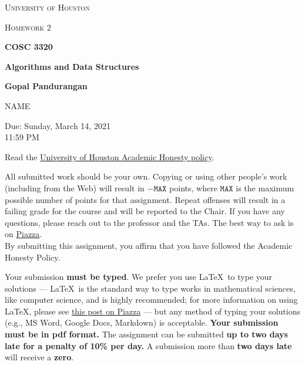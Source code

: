 \documentclass[draft]{article}
\begin{document}
\begin{titlepage}
    \begin{center}
        {\scshape\LARGE University of Houston\par}
        \vspace{1cm}
        {\scshape\Large Homework 2 \par}
        \vspace{1.5cm}
        {\huge\bfseries COSC 3320 \par}
        {\huge\bfseries Algorithms and Data Structures \par}
        \vspace{0.5cm}
        {\large\bfseries Gopal Pandurangan\par}
        \vspace{2cm}
        {\Large NAME\par}
        \vspace{0.5cm}
        {\large \par} Due: Sunday, March 14, 2021\\11:59 PM
    \end{center}


    Read the \href{https://www.uh.edu/provost/policies-resources/honesty/_documents-honesty/academic-honesty-policy.pdf}{University of Houston Academic Honesty policy}.

    \begin{tcolorbox}[title=Academic Honesty Policy,colback=red!15,colframe=red!65!black,fonttitle=\bfseries]All submitted work should be your own. Copying or using other people's work (including from the Web) will result in \(-\texttt{MAX}\) points, where \(\texttt{MAX}\) is the maximum possible number of points for that assignment. Repeat offenses will result in a failing grade for the course and will be reported to the Chair. If you have any questions, please reach out to the professor and the TAs. The best way to ask is on \href{https://piazza.com/uh/spring2021/cosc3320/home}{Piazza}.\\

        By submitting this assignment, you affirm that you have followed the Academic Honesty Policy.
    \end{tcolorbox}

    Your submission \textbf{must be typed}. We prefer you use \LaTeX~to type your solutions --- \LaTeX~is the standard way to type works in mathematical sciences, like computer science, and is highly recommended; for more information on using \LaTeX, please see \href{https://piazza.com/class/kjxhee6ctqe6cj?cid=8}{this post on Piazza} --- but any method of typing your solutions (e.g., MS Word, Google Docs, Markdown) is acceptable. \textbf{Your submission must be in pdf format.} The assignment can be submitted \textbf{up to two days late for a penalty of 10\% per day.} A submission more than \textbf{two days late} will receive a \textbf{zero}.


\end{titlepage}
\end{document}
